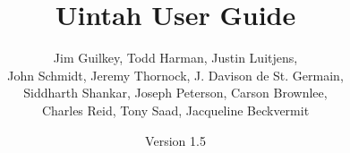 \documentclass[12pt]{report}
\begin{document}
\title{Uintah User Guide}


\author{ Jim Guilkey, Todd Harman, Justin Luitjens, \\ John Schmidt, Jeremy Thornock, J. Davison de St. Germain, \\ Siddharth Shankar, Joseph Peterson, Carson Brownlee,\\ Charles Reid, Tony Saad, Jacqueline Beckvermit}

\date{Version 1.5}

\maketitle

\tableofcontents

%

\newpage







%



\end{document}
